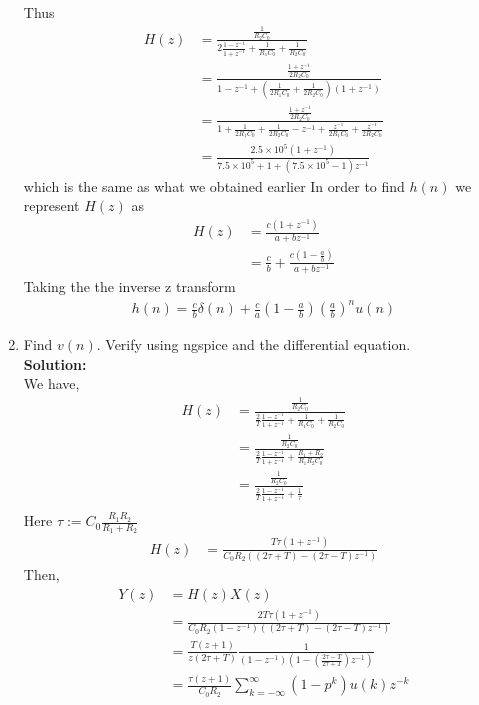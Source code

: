 \documentclass[journal,12pt,twocolumn]{IEEEtran}
\newcommand{\solution}{\noindent \textbf{Solution: }}
\providecommand{\brak}[1]{\ensuremath{\left(#1\right)}}
\numberwithin{equation}{section}
\numberwithin{figure}{section}
\renewcommand\thesection{\arabic{section}}
\begin{document}
\begin{enumerate}[label=\thesection.\arabic*,ref=\thesection.\theenumi]
			Thus
			\begin{align}
				H(z) &= \frac{\frac{1}{R_2C_0}}{2\frac{1-z^{-1}}{1+z^{-1}} + \frac{1}{R_1C_0} + \frac{1}{R_2C_0}} \\
				&= \frac{\frac{1 + z^{-1}}{2R_2C_0}}{1-z^{-1}	 + \brak{\frac{1}{2R_1C_0} + \frac{1}{2R_2C_0}}(1 + z^{-1})} \\
				&= \frac{\frac{1 + z^{-1}}{2R_2C_0}}{1 + \frac{1}{2R_1C_0} + \frac{1}{2R_2C_0} - z^{-1} + \frac{z^{-1}}{2R_1C_0} + \frac{z^{-1}}{2R_2C_0}} \\
				&= \frac{2.5\times10^5 (1+z^{-1})}{7.5\times10^5 + 1 + (7.5\times10^5 - 1)z^{-1}}
			\end{align}
			which is the same as what we obtained earlier
			In order to find $h(n)$ we represent $H(z)$ as \\
			\begin{align}
				H(z) &= \frac{c(1+z^{-1})}{a+bz^{-1}}\\
				&= \frac{c}{b} + \frac{c(1-\frac{a}{b})}{a+bz^{-1}}
			\end{align}
			Taking the the inverse z transform\\
			\begin{align}
				h(n) = \frac{c}{b}\delta(n)+\frac{c}{a}\brak{1-\frac{a}{b}}\brak{\frac{a}{b}}^nu(n)
			\end{align}

		\item Find $v(n)$. Verify using ngspice and the differential equation.\\
			
		\solution\\
			We have,
			\begin{align}
				H(z) & = \frac{\frac{1}{R_2C_0}}{\frac{2}{T}\frac{1-z^{-1}}{1+z^{-1}} + \frac{1}{R_1C_0} + \frac{1}{R_2C_0}} \\
				     & = \frac{\frac{1}{R_2C_0}}{\frac{2}{T}\frac{1-z^{-1}}{1+z^{-1}} + \frac{R_1+R_2}{R_1R_2C_0}}  \\
				     & = \frac{\frac{1}{R_2C_0}}{\frac{2}{T}\frac{1-z^{-1}}{1+z^{-1}} + \frac{1}{\tau}}  \\
			\end{align}
			Here $\tau := C_0\frac{R_1R_2}{R_1+R_2}$
			\begin{align}
				H(z) & = \frac{T\tau\left(1+z^{-1}\right)}{C_0R_2\left((2\tau+T)-(2\tau-T)z^{-1}\right)}
			\end{align}
			Then,
			\begin{align}
				Y(z) & = H(z)X(z) \\
				     & = \frac{2T\tau\brak{1+z^{-1}}}{C_0R_2\brak{1-z^{-1}}\brak{\brak{2\tau+T}-\brak{2\tau-T}z^{-1}}} \\
				     & = \frac{T(z+1)}{z(2\tau+T)}\frac{1}{(1-z^{-1})\left(1-\left(\frac{2\tau-T}{2\tau+T}\right)z^{-1}\right)} \\
				     & = \frac{\tau\brak{z+1}}{C_0R_2}\sum_{k=-\infty}^{\infty}\brak{1-p^k}u(k)z^{-k}
			\end{align}


\end{enumerate}
\end{document}

